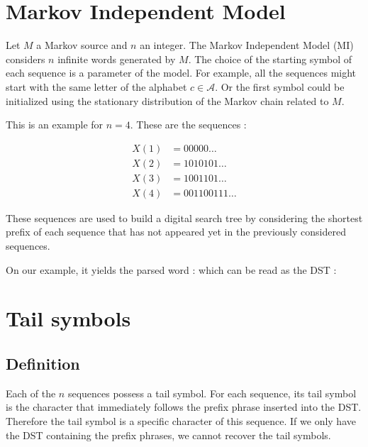 
\section{Markov Independent Model}

Let $M$ a Markov source and $n$ an integer.
The Markov Independent Model (MI) considers $n$ infinite 
words generated by $M$. The choice of the starting symbol of each sequence
is a parameter of the model. For example, all the sequences
might start with the same letter of the alphabet $c \in \mathcal{A}$.
Or the first symbol could be initialized using the stationary distribution
of the Markov chain related to $M$.

\vspace{\baselineskip}
This is an example for $n = 4$. These are the sequences :

\[
\begin{array}{cl}
  X(1) &= 00000\dots \\
  X(2) &= 1010101\dots \\
  X(3) &= 1001101\dots \\
  X(4) &= 001100111\dots
\end{array}
\]

These sequences are used to build a digital search tree
by considering the shortest prefix of each sequence 
that has not appeared yet in the previously considered sequences.

On our example, it yields the parsed word :
which can be read as the DST :

\section{Tail symbols}

\subsection{Definition}

Each of the $n$ sequences possess a tail
symbol. For each sequence, its tail symbol is the character that
immediately follows the prefix phrase inserted into the DST.
Therefore the tail symbol is a specific character of this sequence.
If we only have the DST containing the prefix phrases, we cannot
recover the tail symbols.

